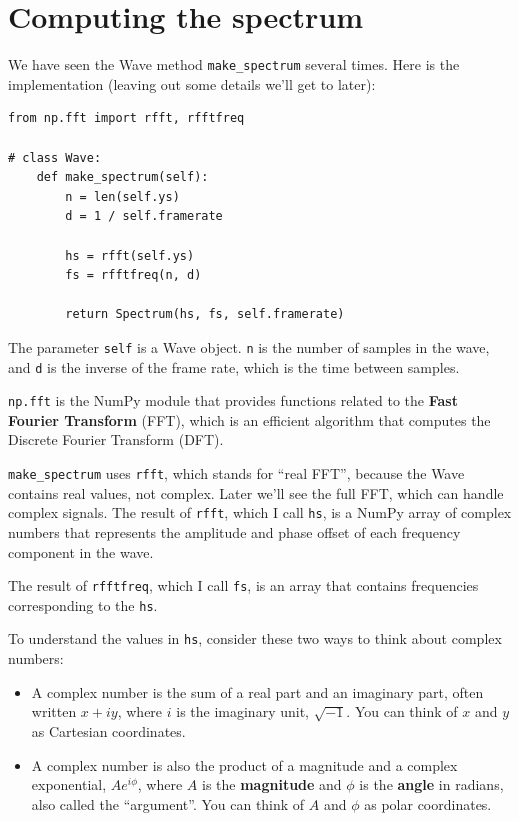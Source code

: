 \documentclass[12pt]{book}
\begin{document}
\section{Computing the spectrum}

We have seen the Wave method \verb"make_spectrum" several times.
Here is the implementation (leaving out some details we'll get
to later):

\begin{verbatim}
from np.fft import rfft, rfftfreq

# class Wave:
    def make_spectrum(self):
        n = len(self.ys)
        d = 1 / self.framerate

        hs = rfft(self.ys)
        fs = rfftfreq(n, d)

        return Spectrum(hs, fs, self.framerate)
\end{verbatim}

The parameter {\tt self} is a Wave object.  {\tt n} is the number
of samples in the wave, and {\tt d} is the inverse of the
frame rate, which is the time between samples.

{\tt np.fft} is the NumPy module that provides functions related
to the {\bf Fast Fourier Transform} (FFT), which is an efficient
algorithm that computes the Discrete Fourier Transform (DFT).

\verb"make_spectrum" uses {\tt rfft}, which stands for ``real
FFT'', because the Wave contains real values, not complex.  Later
we'll see the full FFT, which can handle complex signals.  The result
of {\tt rfft}, which I call {\tt hs}, is a NumPy array of complex
numbers that represents the amplitude and phase offset of each
frequency component in the wave.

The result of {\tt rfftfreq}, which I call {\tt fs}, is an array that
contains frequencies corresponding to the {\tt hs}. 

To understand the values in {\tt hs}, consider these two ways to think
about complex numbers:

\begin{itemize}

\item A complex number is the sum of a real part and an imaginary
  part, often written $x + iy$, where $i$ is the imaginary unit,
  $\sqrt{-1}$.  You can think of $x$ and $y$ as Cartesian coordinates.

\item A complex number is also the product of a magnitude and a
  complex exponential, $A e^{i \phi}$, where $A$ is the {\bf
    magnitude} and $\phi$ is the {\bf angle} in radians, also called
  the ``argument''.  You can think of $A$ and $\phi$ as polar
  coordinates.

\end{itemize}
\end{document}
